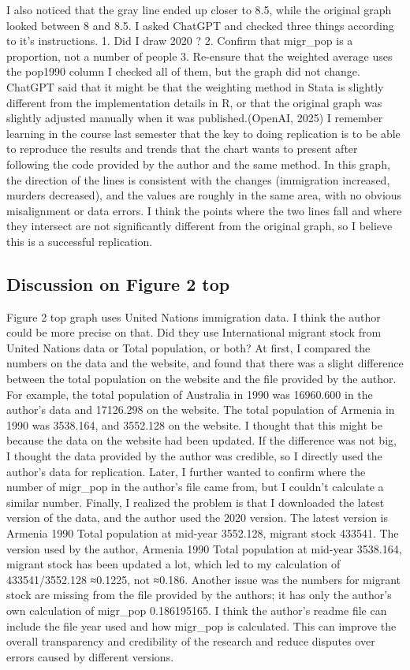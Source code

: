\documentclass[
  jou,
  floatsintext,
  longtable,
  nolmodern,
  notxfonts,
  notimes,
  colorlinks=true,linkcolor=blue,citecolor=blue,urlcolor=blue]{apa7}
\begin{document}
I also noticed that the gray line ended up closer to 8.5, while the
original graph looked between 8 and 8.5. I asked ChatGPT and checked
three things according to it's instructions. 1. Did I draw 2020 ? 2.
Confirm that migr\_pop is a proportion, not a number of people 3.
Re-ensure that the weighted average uses the pop1990 column I checked
all of them, but the graph did not change. ChatGPT said that it might be
that the weighting method in Stata is slightly different from the
implementation details in R, or that the original graph was slightly
adjusted manually when it was published.(OpenAI, 2025) I remember
learning in the course last semester that the key to doing replication
is to be able to reproduce the results and trends that the chart wants
to present after following the code provided by the author and the same
method. In this graph, the direction of the lines is consistent with the
changes (immigration increased, murders decreased), and the values are
roughly in the same area, with no obvious misalignment or data errors. I
think the points where the two lines fall and where they intersect are
not significantly different from the original graph, so I believe this
is a successful replication.

\subsection{Discussion on Figure 2
top}\label{discussion-on-figure-2-top}

Figure 2 top graph uses United Nations immigration data. I think the
author could be more precise on that. Did they use International migrant
stock from United Nations data or Total population, or both? At first, I
compared the numbers on the data and the website, and found that there
was a slight difference between the total population on the website and
the file provided by the author. For example, the total population of
Australia in 1990 was 16960.600 in the author's data and 17126.298 on
the website. The total population of Armenia in 1990 was 3538.164, and
3552.128 on the website. I thought that this might be because the data
on the website had been updated. If the difference was not big, I
thought the data provided by the author was credible, so I directly used
the author's data for replication. Later, I further wanted to confirm
where the number of migr\_pop in the author's file came from, but I
couldn't calculate a similar number. Finally, I realized the problem is
that I downloaded the latest version of the data, and the author used
the 2020 version. The latest version is Armenia 1990 Total population at
mid-year 3552.128, migrant stock 433541. The version used by the author,
Armenia 1990 Total population at mid-year 3538.164, migrant stock has
been updated a lot, which led to my calculation of 433541/3552.128
≈0.1225, not ≈0.186. Another issue was the numbers for migrant stock are
missing from the file provided by the authors; it has only the author's
own calculation of migr\_pop 0.186195165. I think the author's readme
file can include the file year used and how migr\_pop is calculated.
This can improve the overall transparency and credibility of the
research and reduce disputes over errors caused by different versions.
\end{document}
